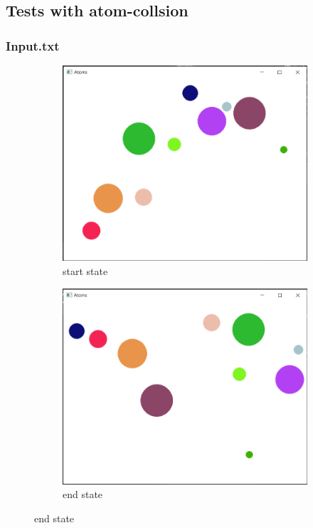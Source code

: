 \documentclass[11pt,titlepage]{article}
\begin{document}
\newpage
		\subsection{Tests with atom-collsion}
			\subsubsection{Input.txt}
				\begin{figure}[h!]
					\centering
					\begin{subfigure}{.5\textwidth}
						\centering
						\includegraphics[scale=0.5]{pictures/input_collision.png}
						\caption{start state}
					\end{subfigure}%
					\begin{subfigure}{.5\textwidth}
						\centering
						\includegraphics[scale=0.5]{pictures/input_collision_final.png}
						\caption{end state}
					\end{subfigure}
				\end{figure}			
			
\end{document}

